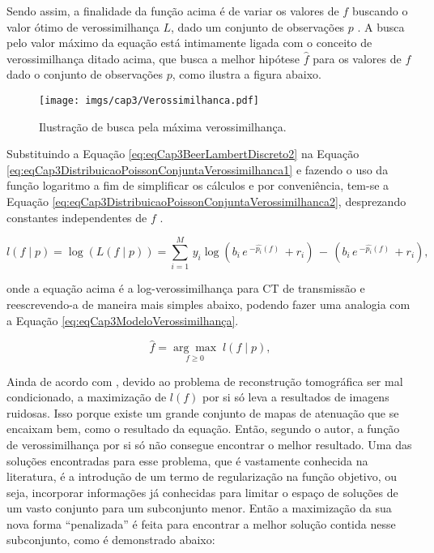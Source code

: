 {{Sendo assim, a finalidade da função acima é de variar os valores de $f$ buscando o valor ótimo de verossimilhança $L$, dado um conjunto de observações $p$ \cite[p. 231]{buzug2008computed}. A busca pelo valor máximo da equação está intimamente ligada com o conceito de verossimilhança ditado acima, que busca a melhor hipótese $\hat{f}$ para os valores de $f$ dado o conjunto de observações $p$, como ilustra a figura abaixo. 


\begin{figure}[H]
	\caption{Ilustração de busca pela máxima verossimilhança.}
	\begin{center}
		\texttt{[image: imgs/cap3/Verossimilhanca.pdf]}
	\end{center}
	\label{fig:imgCap3Verossimilhanca}
\end{figure}   

Substituindo a Equação \ref{eq:eqCap3BeerLambertDiscreto2} na Equação \ref{eq:eqCap3DistribuicaoPoissonConjuntaVerossimilhanca1} e fazendo o uso da função logaritmo a fim de simplificar os cálculos e por conveniência, tem-se a Equação \ref{eq:eqCap3DistribuicaoPoissonConjuntaVerossimilhanca2}, desprezando constantes independentes de $f$ \cite[p. 10]{Fessler2000handbook}. 

\begin{equation}
l(f \mid p) = \log (L(f \mid p)) = \sum_{i=1}^{M} \, y_{i} \log (b_{i} \, e \, ^{-\hat{p_{i}}(f)} \, + r_{i}) \,-\,(b_{i} \, e \, ^{-\hat{p_{i}}(f)} \, + r_{i}),
\label{eq:eqCap3DistribuicaoPoissonConjuntaVerossimilhanca2}
\end{equation} 

\noindent onde a equação acima é a log-verossimilhança para \acs{CT} de transmissão e reescrevendo-a de maneira mais simples abaixo, podendo fazer uma analogia com a Equação \ref{eq:eqCap3ModeloVerossimilhança}.

\begin{equation}
\hat{f} = \underset{f\geq 0}{\arg\max} \; l(f \mid p),
\label{eq:eqCap3VerossimilhançaFinal}
\end{equation}

Ainda de acordo com , devido ao problema de reconstrução tomográfica ser mal condicionado, a maximização de $l(f)$ por si só leva a resultados de imagens ruidosas. Isso porque existe um grande conjunto de mapas de atenuação que se encaixam bem, como o resultado da equação. Então, segundo o autor, a função de verossimilhança por si só não consegue encontrar o melhor resultado. Uma das soluções encontradas para esse problema, que é vastamente conhecida na literatura, é a introdução de um termo de regularização na função objetivo, ou seja, incorporar informações já conhecidas para limitar o espaço de soluções de um vasto conjunto para um subconjunto menor. Então a maximização da sua nova forma ``penalizada'' é feita para encontrar a melhor solução contida nesse subconjunto, como é demonstrado abaixo:     

}}
